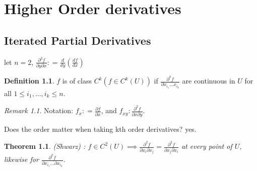 \documentclass[12pt]{book}
\newtheorem{theorem}{Theorem}[section]
\theoremstyle{definition}
\newtheorem{definition}{Definition}[section]
\theoremstyle{remark}
\newtheorem*{remark}{Remark}
\begin{document}
    \chapter{Higher Order derivatives}%
      \label{sec:Higher Order derivatives}
    \section{Iterated Partial Derivatives}%
      \label{sub:Iterated Partial Derivatives}
      \begin{example}
        let $n = 2$, $\frac{\partial^2 {f}}{\partial {y} \partial x}: = \frac{d}{d y} \left(\frac{d {f}}{d {x}} \right)$ 
        
      \end{example}

      \begin{definition}
        $f$ is of class $C^k(f \in C^k (U))$ if $\frac{\partial^k f}{\partial x_{i_1}...x_{i_k}} $ are continuous in $U$ for all $1\leq i_1,..., i_k \leq n$.  
      \end{definition}
      \begin{remark}
        Notation: $f_x : = \frac{\partial {f}}{\partial {x}} $, and $ f_{xy} : \frac{\partial^2 {f}}{\partial {x} \partial {y}} {} $.
      \end{remark}
\begin{example}[Question] Does the order matter when taking kth order derivatives? yes.
\end{example}
\begin{theorem} (Shwarz) : $f \in C^2 (U) \implies \frac{\partial^2 {f}}{\partial {x_i} \partial {x_j}} = \frac{\partial^2 {f}}{\partial {x_j} \partial {x_i}} {}$ at every point of $U$, likewise for $\frac{\partial^k {f}}{\partial {x_{i_1}}... \partial {x_{i_k}}} {}$.
\end{theorem}
\end{document}
